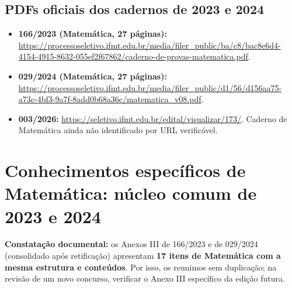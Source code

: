 \documentclass[11pt,a4paper]{article}
\begin{document}
\subsection{PDFs oficiais dos cadernos de 2023 e 2024}
\begin{itemize}
\item \textbf{166/2023 (Matemática, 27 páginas):} \url{https://processoseletivo.ifmt.edu.br/media/filer_public/ba/c8/bac8e6d4-4154-4915-8632-055ef2f67862/caderno-de-provas-matematica.pdf}.
\item \textbf{029/2024 (Matemática, 27 páginas):} \url{https://processoseletivo.ifmt.edu.br/media/filer_public/d1/56/d156aa75-a73c-4bf3-9a7f-8add0b68a36c/matematica_v08.pdf}.
\item \textbf{003/2026:} \url{https://seletivo.ifmt.edu.br/edital/visualizar/173/}. Caderno de Matemática ainda não identificado por URL verificável.
\end{itemize}

\section{Conhecimentos específicos de Matemática: núcleo comum de 2023 e 2024}
\textbf{Constatação documental:} os Anexos III de 166/2023 e de 029/2024 (consolidado após retificação) apresentam \textbf{17 itens de Matemática com a mesma estrutura e conteúdos}. Por isso, os reunimos sem duplicação; na revisão de um novo concurso, verificar o Anexo III específico da edição futura.
\end{document}
